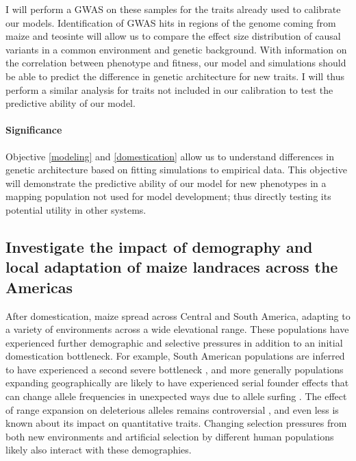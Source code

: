 I will perform a GWAS on these samples for the traits already used to calibrate our models. Identification of GWAS hits in regions of the genome coming from maize and teosinte will allow us to compare the effect size distribution of causal variants in a common environment and genetic background. With information on the correlation between phenotype and fitness, our model and simulations should be able to predict the difference in genetic architecture for new traits. I will thus perform a similar analysis for traits not included in our calibration to test the predictive ability of our model. 

\vspace{-2ex}
\paragraph{Significance}
Objective \ref{modeling} and \ref{domestication} allow us to understand differences in genetic architecture based on fitting simulations to empirical data. This objective will demonstrate the predictive ability of our model for new phenotypes in a mapping population not used for model development; thus directly testing its potential utility in other systems.

\vspace{-1ex}
\subsection{Investigate the impact of demography and local adaptation of maize landraces across the Americas} \vspace{-1ex}
\label{surfing}
After domestication, maize spread across Central and South America, adapting to a variety of environments across a wide elevational range. These populations have experienced further demographic and selective pressures in addition to an initial domestication bottleneck. For example, South American populations are inferred to have experienced a second severe bottleneck \citep{Takuno:2015eu}, and more generally populations expanding geographically are likely to have experienced serial founder effects that can change allele frequencies in unexpected ways due to allele surfing \citep{Klopfstein:2005bl}. The effect of range expansion on deleterious alleles remains controversial \citep{Henn:2015ce, Henn:2015dp, Simons:2014fj, Sudmant:2015}, and even less is known about its impact on quantitative traits. Changing selection pressures from both new environments and artificial selection by different human populations likely also interact with these demographies. 

